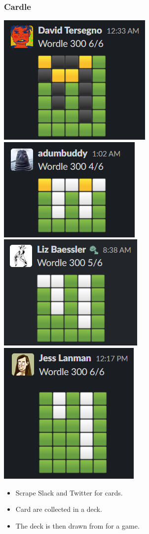 \documentclass[aspectratio=169,12pt]{beamer}
\begin{document}
	\begin{frame}
\frametitle{Cardle}
\hfill
\includegraphics[width=0.2\linewidth]{pix/david}\hfill
\includegraphics[width=0.2\linewidth]{pix/adam}\hfill
\includegraphics[width=0.2\linewidth]{pix/liz}\hfill
\includegraphics[width=0.2\linewidth]{pix/jess}\hfill\\

		\vfill
		\begin{itemize}
			\item  Scrape Slack and Twitter for cards.
			\item Card are collected in a deck.
			\item The deck is then drawn from for a game.
		\end{itemize}
\end{frame}
\end{document}

